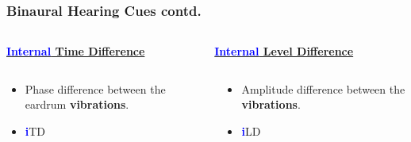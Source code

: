 \documentclass{beamer}
\begin{document}
\begin{frame}[t]
 \frametitle{Binaural Hearing Cues contd.}
  \begin{exampleblock}{}
\begin{columns}
 
    \begin{column}{0.5\textwidth}
    \centering
    \underline{\textbf{\textcolor{blue}{Internal} Time Difference}}

    \end{column}
     
    \begin{column}{0.5\textwidth}
    \centering
    \underline{\textbf{\textcolor{blue}{Internal} Level Difference}}
    \end{column}
    
  \end{columns}
  
    \begin{columns}
 
    \begin{column}{0.5\textwidth}
    \small
     \begin{itemize}
    \item[] Phase difference between the eardrum \textbf{vibrations}.
    \item \textbf{\textcolor{blue}{i}}TD
     \end{itemize}
    \end{column}
     
    \begin{column}{0.5\textwidth}
    \small
     \begin{itemize}
          \item[] Amplitude difference between the \textbf{vibrations}.
          \item \textbf{\textcolor{blue}{i}}LD
     \end{itemize}
    \end{column}
    
  \end{columns}
  \end{exampleblock}  
  \vfill
  
\end{frame}
\end{document}
